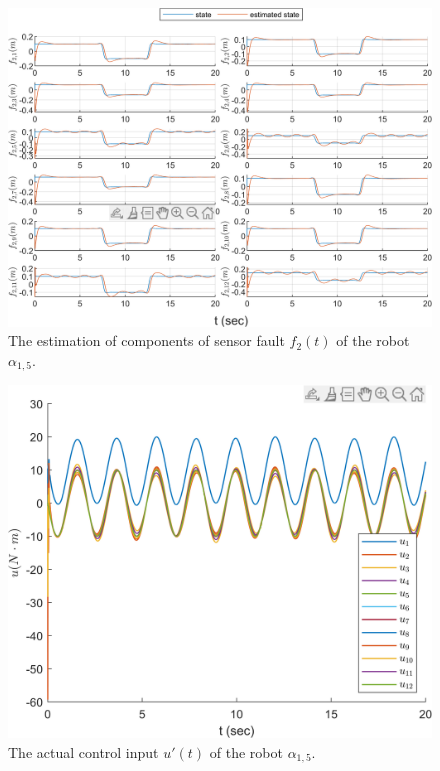 \documentclass[journal,12pt,onecolumn,draftclsnofoot,]{IEEEtran}
\begin{document}
\begin{figure}[htbp]
    \centering
    \includegraphics[scale=.57]{fig/robot (3).png}\caption{The estimation of components of sensor fault $f_2(t)$ of the robot $\alpha_{1,5}$.}%
    \label{fig:robot, fs}
\end{figure}
\begin{figure}[htbp]
    \centering
    \includegraphics[scale=.57]{fig/robot (4).png}\caption{The actual control input $u'(t)$ of the robot $\alpha_{1,5}$.}%
    \label{fig:robot, control}
\end{figure}
\end{document}
